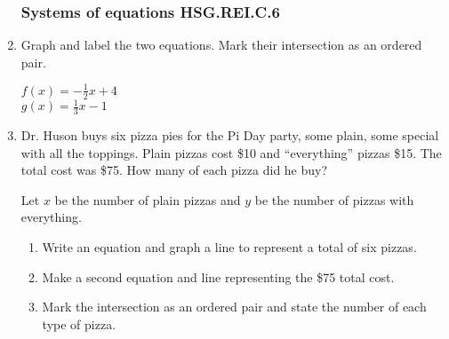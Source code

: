 \documentclass[12pt, twoside]{article}
\begin{document}
\begin{enumerate}
\subsubsection*{Systems of equations \hfill HSG.REI.C.6}
\item Graph and label the two equations. Mark their intersection as an ordered pair.
  \begin{multicols}{2}
    $f(x) = -\frac{1}{2}x+4$ \\[1cm]
    $g(x) = \frac{1}{3}x-1$ \\
\end{multicols}

  
\item Dr. Huson buys six pizza pies for the Pi Day party, some plain, some special with all the toppings. Plain pizzas cost \$10 and ``everything'' pizzas \$15. The total cost was \$75. How many of each pizza did he buy?
\begin{multicols}{2}
Let $x$ be the number of plain pizzas and $y$ be the number of pizzas with everything.
\begin{enumerate}
  \item Write an equation and graph a line to represent a total of six pizzas.
  \item Make a second equation and line representing the \$75 total cost.
  \item Mark the intersection as an ordered pair and state the number of each type of pizza.
\end{enumerate}
  \begin{flushright}
     \vspace{2cm}
  \end{flushright}
\end{multicols}


\end{enumerate}
\end{document}
